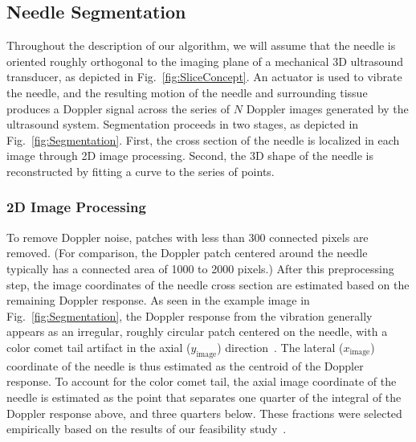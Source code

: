 \subsection{Needle Segmentation}
Throughout the description of our algorithm, we will assume that the needle is oriented roughly orthogonal to the imaging plane of a mechanical 3D ultrasound transducer, as depicted in Fig.~\ref{fig:SliceConcept}. An actuator is used to vibrate the needle, and the resulting motion of the needle and surrounding tissue produces a Doppler signal across the series of $N$ Doppler images generated by the ultrasound system. Segmentation proceeds in two stages, as depicted in Fig.~\ref{fig:Segmentation}. First, the cross section of the needle is localized in each image through 2D image processing. Second, the 3D shape of the needle is reconstructed by fitting a curve to the series of points.

\subsubsection{2D Image Processing}
To remove Doppler noise, patches with less than 300 connected pixels are removed. (For comparison, the Doppler patch centered around the needle typically has a connected area of 1000 to 2000 pixels.) After this preprocessing step, the image coordinates of the needle cross section are estimated based on the remaining Doppler response. As seen in the example image in Fig.~\ref{fig:Segmentation}, the Doppler response from the vibration generally appears as an irregular, roughly circular patch centered on the needle, with a color comet tail artifact in the axial ($y_\text{image}$) direction~\cite{Tchelepi2009}. The lateral ($x_\text{image}$) coordinate of the needle is thus estimated as the centroid of the Doppler response. To account for the color comet tail, the axial image coordinate of the needle is estimated as the point that separates one quarter of the integral of the Doppler response above, and three quarters below. These fractions were selected empirically based on the results of our feasibility study~\cite{Adebar2013}. 

